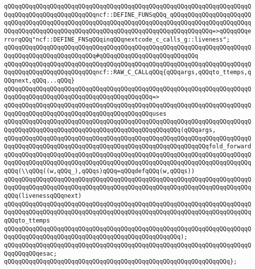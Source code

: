 \verb|qQQqqQQqqQQqqQQqqQQqqQQqqQQqqQQqqQQqqQQqqQQqqQQqqQQqqQQqqQQqqQQqqQQqqQQqqQQqqQQqqQQqqQQqqQQqqQQqncf::DEFINE_FUNSqQQq_qQQqqQQqqQQqqQQqqQQqqQQqqQQqqQQqqQQqqQQqqQQqqQQqqQQqqQQqqQQqqQQqqQQqqQQqqQQqqQQqqQQqqQQqqQQqqQQqqQQqqQQqqQQqqQQqqQQqqQQqqQQqqQQqqQQqqQQqqQQqqQQqqQQqqQQq=>qQQqqQQqerrorqQQq"ncf::DEFINE_FNSqQQqinqQQqnextcode_c_calls_g::liveness";|\newline
\verb|qQQqqQQqqQQqqQQqqQQqqQQqqQQqqQQqqQQqqQQqqQQqqQQqqQQqqQQqqQQqqQQqqQQqqQQqqQQqqQQqqQQqqQQqqQQqqQQq#qQQqqQQqqQQqqQQqqQQqqQQqqQQq|\newline
\verb|qQQqqQQqqQQqqQQqqQQqqQQqqQQqqQQqqQQqqQQqqQQqqQQqqQQqqQQqqQQqqQQqqQQqqQQqqQQqqQQqqQQqqQQqqQQqqQQqncf::RAW_C_CALLqQQq{qQQqargs,qQQqto_ttemps,qQQqnext,qQQq...qQQq}|\newline
\verb|qQQqqQQqqQQqqQQqqQQqqQQqqQQqqQQqqQQqqQQqqQQqqQQqqQQqqQQqqQQqqQQqqQQqqQQqqQQqqQQqqQQqqQQqqQQqqQQqqQQqqQQqqQQqqQQq=>|\newline
\verb|qQQqqQQqqQQqqQQqqQQqqQQqqQQqqQQqqQQqqQQqqQQqqQQqqQQqqQQqqQQqqQQqqQQqqQQqqQQqqQQqqQQqqQQqqQQqqQQqqQQqqQQqqQQqqQQquses|\newline
\verb|qQQqqQQqqQQqqQQqqQQqqQQqqQQqqQQqqQQqqQQqqQQqqQQqqQQqqQQqqQQqqQQqqQQqqQQqqQQqqQQqqQQqqQQqqQQqqQQqqQQqqQQqqQQqqQQqqQQqqQQq(qQQqargs,|\newline
\verb|qQQqqQQqqQQqqQQqqQQqqQQqqQQqqQQqqQQqqQQqqQQqqQQqqQQqqQQqqQQqqQQqqQQqqQQqqQQqqQQqqQQqqQQqqQQqqQQqqQQqqQQqqQQqqQQqqQQqqQQqqQQqqQQqfold_forward|\newline
\verb|qQQqqQQqqQQqqQQqqQQqqQQqqQQqqQQqqQQqqQQqqQQqqQQqqQQqqQQqqQQqqQQqqQQqqQQqqQQqqQQqqQQqqQQqqQQqqQQqqQQqqQQqqQQqqQQqqQQqqQQqqQQqqQQqqQQqqQQqqQQqqQQq(\\qQQq((w,qQQq_),qQQqs)qQQq=qQQqdefqQQq(w,qQQqs))|\newline
\verb|qQQqqQQqqQQqqQQqqQQqqQQqqQQqqQQqqQQqqQQqqQQqqQQqqQQqqQQqqQQqqQQqqQQqqQQqqQQqqQQqqQQqqQQqqQQqqQQqqQQqqQQqqQQqqQQqqQQqqQQqqQQqqQQqqQQqqQQqqQQqqQQq(livenessqQQqnext)|\newline
\verb|qQQqqQQqqQQqqQQqqQQqqQQqqQQqqQQqqQQqqQQqqQQqqQQqqQQqqQQqqQQqqQQqqQQqqQQqqQQqqQQqqQQqqQQqqQQqqQQqqQQqqQQqqQQqqQQqqQQqqQQqqQQqqQQqqQQqqQQqqQQqqQQqto_ttemps|\newline
\verb|qQQqqQQqqQQqqQQqqQQqqQQqqQQqqQQqqQQqqQQqqQQqqQQqqQQqqQQqqQQqqQQqqQQqqQQqqQQqqQQqqQQqqQQqqQQqqQQqqQQqqQQqqQQqqQQqqQQqqQQq);|\newline
\verb|qQQqqQQqqQQqqQQqqQQqqQQqqQQqqQQqqQQqqQQqqQQqqQQqqQQqqQQqqQQqqQQqqQQqqQQqqQQqqQQqesac;|\newline
\verb|qQQqqQQqqQQqqQQqqQQqqQQqqQQqqQQqqQQqqQQqqQQqqQQqqQQqqQQqqQQqqQQq};|\newline
